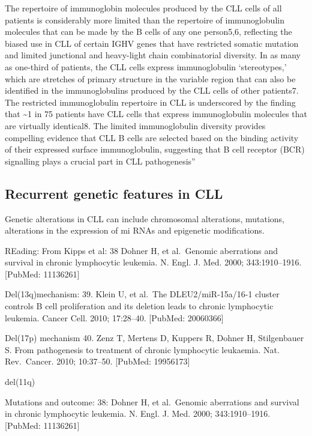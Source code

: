 \documentclass[11pt, a4paper, twosided]{book}
\begin{document}
The repertoire of immunoglobin molecules produced by the CLL cells of all patients is considerably more limited than the repertoire of immunoglobulin molecules that can be made by the B cells of any one person5,6, reflecting the biased use in CLL of certain IGHV genes that have restricted somatic mutation and limited junctional and heavy-light chain combinatorial diversity. In as many as one-third of patients, the CLL cells express immunoglobulin `stereotypes,' which are stretches of primary structure in the variable region that can also be identified in the immunoglobulins produced by the CLL cells of other patients7. The restricted immunoglobulin repertoire in CLL is underscored by the finding that \textasciitilde1 in 75 patients have CLL cells that express immunoglobulin molecules that are virtually identical8. The limited immunoglobulin diversity provides compelling evidence that CLL B cells are selected based on the binding activity of their expressed surface immunoglobulin, suggesting that B cell receptor (BCR) signalling plays a crucial part in CLL pathogenesis''

\hypertarget{recurrent-genetic-features-in-cll}{%
\subsection{Recurrent genetic features in CLL}\label{recurrent-genetic-features-in-cll}}

Genetic alterations in CLL can include chromosomal alterations, mutations, alterations in the expression of mi RNAs and epigenetic modifications.

REading:
From Kipps et al:
38 Dohner H, et al.~Genomic aberrations and survival in chronic lymphocytic leukemia. N. Engl. J. Med. 2000; 343:1910--1916. {[}PubMed: 11136261{]}

Del(13q)mechanism: 39. Klein U, et al.~The DLEU2/miR-15a/16-1 cluster controls B cell proliferation and its deletion leads to chronic lymphocytic leukemia. Cancer Cell. 2010; 17:28--40. {[}PubMed: 20060366{]}

Del(17p) mechanism 40. Zenz T, Mertens D, Kuppers R, Dohner H, Stilgenbauer S. From pathogenesis to treatment of chronic lymphocytic leukaemia. Nat. Rev.~Cancer. 2010; 10:37--50. {[}PubMed: 19956173{]}

del(11q)

Mutations and outcome:
38: Dohner H, et al.~Genomic aberrations and survival in chronic lymphocytic leukemia. N. Engl. J. Med. 2000; 343:1910--1916. {[}PubMed: 11136261{]}
\end{document}
